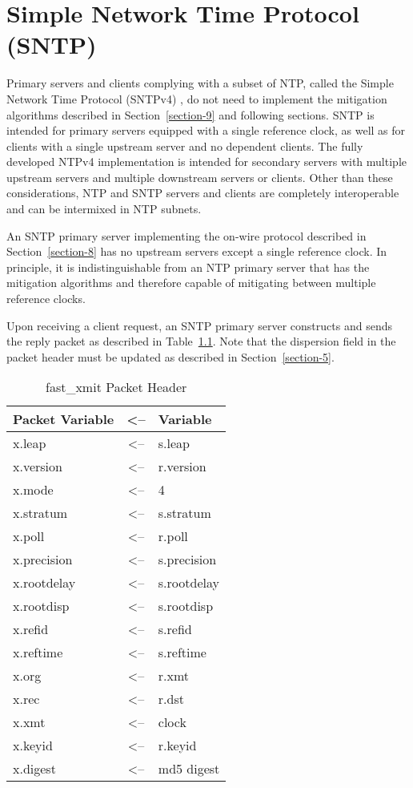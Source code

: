 \chapter{Simple Network Time Protocol (SNTP)}
\label{section-14}

Primary servers and clients complying with a subset of NTP, called
the Simple Network Time Protocol (SNTPv4) \cite{RFC4330}, do not need to
implement the mitigation algorithms described in Section~\ref{section-9} and
following sections.  SNTP is intended for primary servers equipped
with a single reference clock, as well as for clients with a single
upstream server and no dependent clients.  The fully developed NTPv4
implementation is intended for secondary servers with multiple
upstream servers and multiple downstream servers or clients.  Other
than these considerations, NTP and SNTP servers and clients are
completely interoperable and can be intermixed in NTP subnets.

An SNTP primary server implementing the on-wire protocol described in
Section~\ref{section-8} has no upstream servers except a single reference clock.
In principle, it is indistinguishable from an NTP primary server that
has the mitigation algorithms and therefore capable of mitigating
between multiple reference clocks.

Upon receiving a client request, an SNTP primary server constructs
and sends the reply packet as described in Table~\ref{fast_xmit_packet_header}.  Note that the
dispersion field in the packet header must be updated as described in
Section~\ref{section-5}.

\begin{table}[htb]
\center
\begin{tabular}{| l | c | l |}
\hline
Packet Variable & <-- & Variable \\
\hline
\hline
x.leap      & <-- & s.leap      \\
x.version   & <-- & r.version   \\
x.mode      & <-- & 4           \\
x.stratum   & <-- & s.stratum   \\
x.poll      & <-- & r.poll      \\
x.precision & <-- & s.precision \\
x.rootdelay & <-- & s.rootdelay \\
x.rootdisp  & <-- & s.rootdisp  \\
x.refid     & <-- & s.refid     \\
x.reftime   & <-- & s.reftime   \\
x.org       & <-- & r.xmt       \\
x.rec       & <-- & r.dst       \\
x.xmt       & <-- & clock       \\
x.keyid     & <-- & r.keyid     \\
x.digest    & <-- & md5 digest  \\
\hline
\end{tabular}
\caption{fast\_xmit Packet Header}
\label{fast_xmit_packet_header}
\end{table}

